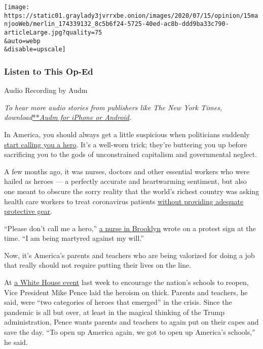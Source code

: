 \texttt{[image: https://static01.graylady3jvrrxbe.onion/images/2020/07/15/opinion/15manjooWeb/merlin\_174339132\_8c5b6f24-5725-40ed-ac8b-ddd9ba33c790-articleLarge.jpg?quality=75\\\&auto=webp\\\&disable=upscale]}

\hypertarget{listen-to-this-op-ed}{%
\subsubsection{Listen to This Op-Ed}\label{listen-to-this-op-ed}}

Audio Recording by Audm

\emph{To hear more audio stories from publishers like The New York
Times,
download}\href{https://www.audm.com/?utm_source=nytmag\&utm_medium=embed\&utm_campaign=left_behind_draper}{**}\href{https://www.audm.com/?utm_source=nytopinion\&utm_medium=embed\&utm_campaign=please_call_heroes}{\emph{Audm
for iPhone or Android}}\emph{.}

In America, you should always get a little suspicious when politicians
suddenly
\href{https://slate.com/news-and-politics/2020/04/coronavirus-humans-vs-heroes.html}{start
calling you a hero}. It's a well-worn trick; they're buttering you up
before sacrificing you to the gods of unconstrained capitalism and
governmental neglect.

A few months ago, it was nurses, doctors and other essential workers who
were hailed as heroes --- a perfectly accurate and heartwarming
sentiment, but also one meant to obscure the sorry reality that the
world's richest country was asking health care workers to treat
coronavirus patients
\href{https://www.nytimes3xbfgragh.onion/2020/03/25/opinion/coronavirus-face-mask.html}{without
providing adequate protective gear}.

``Please don't call me a hero,''
\href{https://slate.com/technology/2020/04/nurse-hero-protest.html}{a
nurse in Brooklyn} wrote on a protest sign at the time. ``I am being
martyred against my will.''

Now, it's America's parents and teachers who are being valorized for
doing a job that really should not require putting their lives on the
line.

At
\href{https://www.whitehouse.gov/briefings-statements/remarks-president-trump-safely-reopening-americas-schools/}{a
White House event} last week to encourage the nation's schools to
reopen, Vice President Mike Pence laid the heroism on thick. Parents and
teachers, he said, were ``two categories of heroes that emerged'' in the
crisis. Since the pandemic is all but over, at least in the magical
thinking of the Trump administration, Pence wants parents and teachers
to again put on their capes and save the day. ``To open up America
again, we got to open up America's schools,'' he said.

